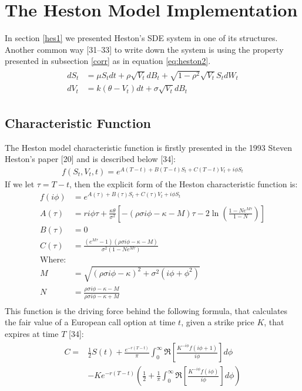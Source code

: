 \documentclass[12pt,twoside]{reedthesis}
\theoremstyle{definition}
\theoremstyle{definition}
\theoremstyle{remark}
\begin{document}
  \chapter{The Heston Model
  Implementation}\label{the-heston-model-implementation}
  
  In section \ref{hes1} we presented Heston's SDE system in one of its
  structures. Another common way {[}31--33{]} to write down the system is
  using the property presented in subsection \ref{corr} as in equation
  \eqref{eq:heston2}.
  \begin{align}
  \label{eq:heston2}
  \begin{split}
  dS_t &= \mu S_t dt + \rho \sqrt{V_t} dB_t + \sqrt{1 - \rho^2} \sqrt{V_t} S_t dW_t \\
  dV_t &= k(\theta - V_t)dt + \sigma \sqrt{V_t} dB_t 
  \end{split}
  \end{align}
  \section{Characteristic Function}\label{characteristic-function}
  
  The Heston model characteristic function is firstly presented in the
  1993 Steven Heston's paper {[}20{]} and is described below {[}34{]}:
  \begin{align}
  f(S_t, V_t, t) = e^{A(T-t)+B(T-t)S_t + C(T-t)V_t + i \phi S_t}
  \end{align}
  If we let \(\tau = T-t\), then the explicit form of the Heston
  characteristic function is:
  \begin{align*}
  f(i \phi) &= e^{A(\tau)+B(\tau)S_t + C(\tau)V_t + i \phi S_t} \\
  A(\tau) &= r i \phi \tau + \frac{\kappa \theta}{\sigma^2} \left[ - (\rho \sigma i \phi - \kappa - M) \tau - 2 \ln\left(\frac{1-N e^{M \tau}}{1-N}\right) \right] \\
  B(\tau) &= 0 \\
  C(\tau) &= \frac{(e^{M \tau}-1)(\rho \sigma i \phi - \kappa - M)}{\sigma^2 (1-N e^{M \tau})} \\
  \text{Where:} & \\
  M &= \sqrt{(\rho \sigma i \phi - \kappa)^2 + \sigma^2 (i \phi + \phi^2)} \\
  N &= \frac{\rho \sigma i \phi - \kappa - M}{\rho \sigma i \phi - \kappa + M} \\
  \end{align*}
  This function is the driving force behind the following formula, that
  calculates the fair value of a European call option at time \(t\), given
  a strike price \(K\), that expires at time \(T\) {[}34{]}:
  \begin{align} 
  \label{eq:cfheston}
  \begin{split}
  C = & \frac{1}{2} S(t) + \frac{e^{-r(T-t)}}{\pi}\int_{0}^{\infty}{\Re \left[ \frac{K^{-i \phi} f(i \phi + 1)}{i \phi} \right] d\phi} \\
  & -Ke^{-r(T-t)}\left( \frac{1}{2} + \frac{1}{\pi} \int_{0}^{\infty}{\Re \left[ \frac{K^{-i \phi} f(i \phi)}{i \phi} \right]}  d\phi \right)
  \end{split}
  \end{align}
\end{document}
